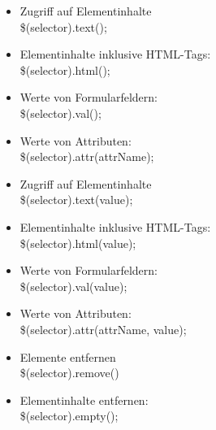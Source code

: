 \documentclass[10pt]{article}
\begin{document}
    \begin{tcolorbox}[
    colback=Red!5!white,
    colframe=Red!75!black,
    title={\centering Inhalte und Attribute auslesen}]
    \begin{itemize}
        \item Zugriff auf Elementinhalte \\ \$(selector).text();
        \item Elementinhalte inklusive HTML-Tags: \\ \$(selector).html();
        \item Werte von Formularfeldern: \\ \$(selector).val();
        \item Werte von Attributen: \\ \$(selector).attr(attrName);
    \end{itemize}
    \end{tcolorbox}

    \begin{tcolorbox}[
    colback=Red!5!white,
    colframe=Red!75!black,
    title={\centering Inhalte und Attribute setzen}]
    \begin{itemize}
        \item Zugriff auf Elementinhalte \\ \$(selector).text(value);
        \item Elementinhalte inklusive HTML-Tags: \\ \$(selector).html(value);
        \item Werte von Formularfeldern: \\ \$(selector).val(value);
        \item Werte von Attributen: \\ \$(selector).attr(attrName, value);
    \end{itemize}
    \end{tcolorbox}

    \begin{tcolorbox}[
    colback=Red!5!white,
    colframe=Red!75!black,
    title={\centering Elemente löschen oder leeren}]
    \begin{itemize}
        \item Elemente entfernen \\ \$(selector).remove()
        \item Elementinhalte entfernen: \\ \$(selector).empty();
    \end{itemize}
    \end{tcolorbox}
\end{document}
